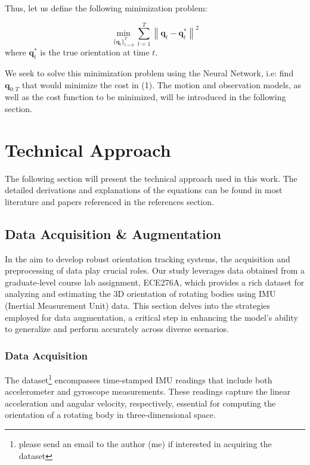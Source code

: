 \documentclass[conference]{IEEEtran}
\begin{document}
Thus, let us define the following minimization problem:

\begin{equation}\label{eq:minimization_problem}
\min_{\{\bm{q}_t\}_{t=0}^T} \sum_{t=1}^T \left\| \bm{q}_t - \bm{q}_t^* \right\|^2
\end{equation}
where \( \bm{q}_t^* \) is the true orientation at time \( t \).

We seek to solve this minimization problem using the Neural Network, i.e: find $\bm{q}_{0:T}$ that would minimize the
cost in (1). The motion and observation models, as well as the cost function to be minimized, will be introduced in the following section.

\section{Technical Approach}

The following section will present the technical approach used in this work. The detailed
derivations and explanations of the equations can be found in most literature and papers referenced in the references
section.

\subsection{Data Acquisition \& Augmentation}
In the aim to develop robust orientation tracking systems, the acquisition and preprocessing of data play crucial roles. Our study leverages data obtained from a graduate-level course lab assignment, ECE276A, which provides a rich dataset for analyzing and estimating the 3D orientation of rotating bodies using IMU (Inertial Measurement Unit) data. This section delves into the strategies employed for data augmentation, a critical step in enhancing the model's ability to generalize and perform accurately across diverse scenarios.

\subsubsection{Data Acquisition}

The dataset\footnote{please send an email to the author (me) if interested in acquiring the dataset} encompasses time-stamped IMU readings that include both accelerometer and gyroscope measurements. These readings capture the linear acceleration and angular velocity, respectively, essential for computing the orientation of a rotating body in three-dimensional space.
\end{document}

